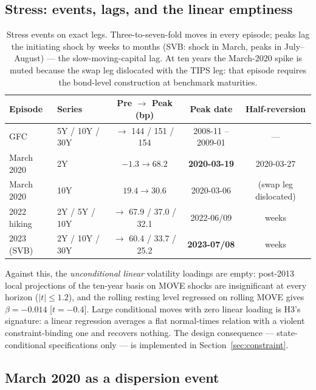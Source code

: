 \documentclass[11pt]{article}
\begin{document}
\subsection{Stress: events, lags, and the linear emptiness}

\begin{table}[h!]
\centering\small
\begin{tabular}{llccc}
\toprule
Episode & Series & Pre $\to$ Peak (bp) & Peak date & Half-reversion \\
\midrule
GFC & 5Y / 10Y / 30Y & $\to$ 144 / 151 / 154 & 2008-11 -- 2009-01 & --- \\
March 2020 & 2Y & $-1.3\to68.2$ & \textbf{2020-03-19} & 2020-03-27 \\
March 2020 & 10Y & $19.4\to30.6$ & 2020-03-06 & (swap leg dislocated) \\
2022 hiking & 2Y / 5Y / 10Y & $\to$ 67.9 / 37.0 / 32.1 & 2022-06/09 & weeks \\
2023 (SVB) & 2Y / 10Y / 30Y & $\to$ 60.4 / 33.7 / 25.2 & \textbf{2023-07/08} & weeks \\
\bottomrule
\end{tabular}
\caption{Stress events on exact legs. Three-to-seven-fold moves in every episode; peaks lag the initiating shock by weeks to months (SVB: shock in March, peaks in July--August) --- the slow-moving-capital lag. At ten years the March-2020 spike is muted because the swap leg dislocated with the TIPS leg: that episode requires the bond-level construction at benchmark maturities.}
\end{table}

Against this, the \emph{unconditional linear} volatility loadings are empty: post-2013 local projections of the ten-year basis on MOVE shocks are insignificant at every horizon ($|t|\le1.2$), and the rolling resting level regressed on rolling MOVE gives $\beta=-0.014$ [$t=-0.4$]. Large conditional moves with zero linear loading is H3's signature: a linear regression averages a flat normal-times relation with a violent constraint-binding one and recovers nothing. The design consequence --- state-conditional specifications only --- is implemented in Section~\ref{sec:constraint}.

\subsection{March 2020 as a dispersion event}\label{sec:disp}
\end{document}
